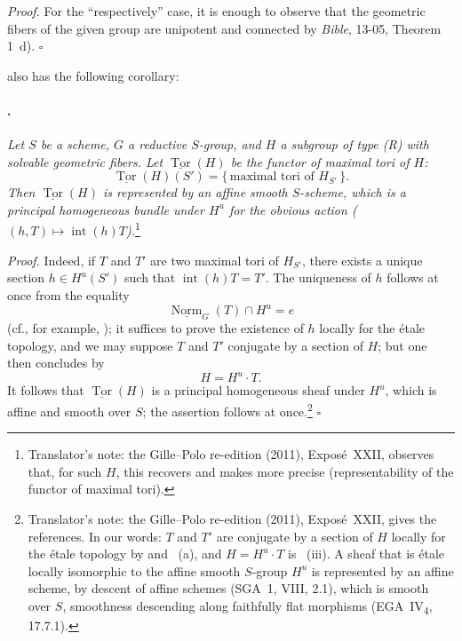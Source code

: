 \textit{Proof.}
For the ``respectively'' case, it is enough to observe that the
geometric fibers of the given group are unipotent and connected by
\emph{Bible}, 13-05, Theorem 1~d).
\hfill\(\square\)

 also has the following corollary:

\paragraph{.}
\textit{Let \(S\) be a scheme, \(G\) a reductive \(S\)-group, and
\(H\) a subgroup of type \textup{(R)} with solvable geometric
fibers. Let \(\underline{\operatorname{Tor}}(H)\) be the functor of
maximal tori of \(H\):}
\[
  \underline{\operatorname{Tor}}(H)(S')
  =
  \{\,\text{maximal tori of }H_{S'}\,\}.
\]
\textit{Then \(\underline{\operatorname{Tor}}(H)\) is represented by
an affine smooth \(S\)-scheme, which is a principal homogeneous
bundle under \(H^u\) for the obvious action
\textup{(\((h,T)\mapsto\operatorname{int}(h)T\))}.}\footnote{Translator's note: the Gille--Polo re-edition (2011), Exposé~XXII,
observes that, for such \(H\), this recovers and makes more precise
 (representability of the functor of maximal tori).}

\textit{Proof.}
Indeed, if \(T\) and \(T'\) are two maximal tori of \(H_{S'}\), there
exists a unique section \(h\in H^u(S')\) such that
\(\operatorname{int}(h)T=T'\). The uniqueness of \(h\) follows at
once from the equality
\[
  \underline{\operatorname{Norm}}_G(T)\cap H^u=e
\]
\textup{(cf., for example, )}; it suffices to prove
the existence of \(h\) locally for the étale topology, and we may suppose
\(T\) and \(T'\) conjugate by a section of \(H\); but one then concludes by
\[
  H=H^u\cdot T.
\]
It follows that
\(\underline{\operatorname{Tor}}(H)\) is a principal homogeneous
sheaf under \(H^u\), which is affine and smooth over \(S\); the
assertion follows at once.\footnote{Translator's note: the Gille--Polo re-edition (2011), Exposé~XXII,
gives the references. In our words: \(T\) and \(T'\) are conjugate by a section
of \(H\) locally for the étale topology by  and ~(a), and
\(H=H^u\cdot T\) is ~(iii). A sheaf that is étale locally isomorphic to the
affine smooth \(S\)-group \(H^u\) is represented by an affine scheme, by
descent of affine schemes (SGA~1, VIII, 2.1), which is smooth over \(S\),
smoothness descending along faithfully flat morphisms
(EGA~IV\textsubscript{4}, 17.7.1).}
\hfill\(\square\)

